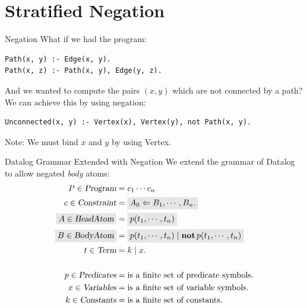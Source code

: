 \section{Stratified Negation}

\begin{frame}[fragile]{Negation}
What if we had the program:

\begin{lstlisting}[language=flix,xleftmargin=0.8cm]
Path(x, y) :- Edge(x, y).
Path(x, z) :- Path(x, y), Edge(y, z).
\end{lstlisting}

\pause

And we wanted to compute the pairs $(x, y)$ which are not connected by a path?
We can achieve this by using negation:

\begin{lstlisting}[language=flix,xleftmargin=0.8cm]
Unconnected(x, y) :- Vertex(x), Vertex(y), not Path(x, y).
\end{lstlisting}

Note: We must bind $x$ and $y$ by using \textsf{Vertex}.
\end{frame}

\begin{frame}{Datalog Grammar Extended with Negation}
We extend the grammar of Datalog to allow negated \emph{body} atoms:
{
\large
\begin{align*}
P \in \textsl{Program}      &= c_1 \cdots c_n \\
c \in \textsl{Constraint}   &= \Highlight{A_0 \Leftarrow B_1, \cdots, B_n.} \\ 
\Highlight{A \in \textsl{HeadAtom}}     &= \Highlight{p(t_1, \cdots, t_n)} \\
\Highlight{B \in \textsl{BodyAtom}}     &= \Highlight{p(t_1, \cdots, t_n) \mid \text{\textbf{not}} \, p(t_1, \cdots, t_n)} \\
t \in \textsl{Term}         &= k \mid x. \\
\\
p \in \textsl{Predicates}   & = \text{is a finite set of predicate symbols.} \\
x \in \textsl{Variables}    & = \text{is a finite set of variable symbols.} \\
k \in \textsl{Constants}    & = \text{is a finite set of constants.}
\end{align*}
}
\end{frame}

